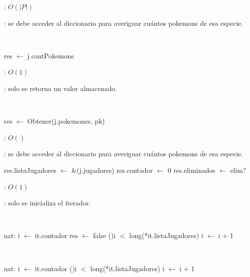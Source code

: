\begin{Algoritmos}
	\complejidad: $O(|P|)$

	\justifcomp: se debe acceder al diccionario para averiguar cuántos pokemons de esa especie.

	~

	\begin{algorithm}[H]
		\NoCaptionOfAlgo
		\caption{}
		res $\leftarrow$ j.cantPokemons
	\end{algorithm}

	\complejidad: $O(1)$

	\justifcomp: solo se retorna un valor almacenado.

	~

	\begin{algorithm}[H]
		\NoCaptionOfAlgo
		\caption{}
		res $\leftarrow$ Obtener(j.pokemones, pk)\; 
	\end{algorithm}

	\complejidad: $O()$

	\justifcomp: se debe acceder al diccionario para averiguar cuántos pokemons de esa especie.



	\begin{algorithm}[H]
		\NoCaptionOfAlgo
		\caption{}
		res.listaJugadores $\leftarrow$ \&(j.jugadores)
		res.contador $\leftarrow$ 0
		res.eliminados $\leftarrow$ elim?
	\end{algorithm}

	\complejidad: $O(1)$

	\justifcomp: solo se inicializa el iterador.

	~

	\begin{algorithm}[H]
		\NoCaptionOfAlgo
		\caption{}
		nat: i $\leftarrow$ it.contador
		res $\leftarrow$ false
		\While(){i $<$ long(*it.listaJugadores)}{
			i $\leftarrow$ i + 1
		}
	\end{algorithm}

	~

	\begin{algorithm}[H]
		\NoCaptionOfAlgo
		\caption{}
		nat: i $\leftarrow$ it.contador
		\While(){i $<$ long(*it.listaJugadores)}{
			i $\leftarrow$ i + 1
		}
	\end{algorithm}


\end{Algoritmos}
